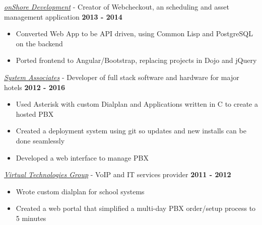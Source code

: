 \documentclass{res}
\begin{document}
\begin{resume}
\href{http://www.onshored.com}{{\it onShore Development}} - Creator of Webcheckout, an scheduling and asset management application {\bf \hfill 2013 - 2014 }
\begin{itemize}  \itemsep -2pt
    \item Converted Web App to be API driven, using Common Lisp and PostgreSQL on the backend
    \item Ported frontend to Angular/Bootstrap, replacing projects in Dojo and jQuery
\end{itemize}

\href{http://www.saicorporate.com}{{\it System Associates}} - Developer of full stack software and hardware for major hotels {\bf \hfill 2012 - 2016 }
\begin{itemize}  \itemsep -2pt
    \item Used Asterisk with custom Dialplan and Applications written in C to create a hosted PBX
    \item Created a deployment system using git so updates and new installs can be done seamlessly
    \item Developed a web interface to manage PBX
\end{itemize}

\href{http://www.vpcusa.com}{{\it Virtual Technologies Group}} - VoIP and IT services provider {\bf \hfill 2011 - 2012 }
\begin{itemize}  \itemsep -2pt
    \item Wrote custom dialplan for school systems
    \item Created a web portal that simplified a multi-day PBX order/setup process to 5 minutes
\end{itemize}


\end{resume}
\end{document}
